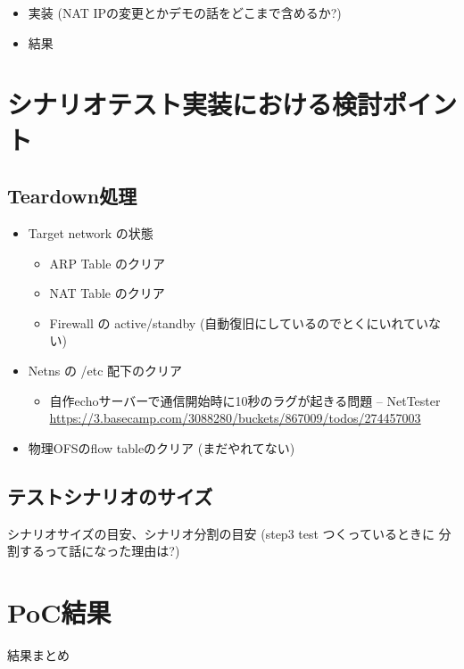 \begin{itemize}
 \item 実装 (NAT IPの変更とかデモの話をどこまで含めるか?)
 \item 結果
\end{itemize}

\section{シナリオテスト実装における検討ポイント}

\subsection{Teardown処理}

\begin{itemize}
 \item Target network の状態
       \begin{itemize}
        \item ARP Table のクリア
        \item NAT Table のクリア
        \item Firewall の active/standby (自動復旧にしているのでとくにいれていない)
       \end{itemize}
 \item Netns の /etc 配下のクリア
       \begin{itemize}
        \item 自作echoサーバーで通信開始時に10秒のラグが起きる問題 – NetTester \url{https://3.basecamp.com/3088280/buckets/867009/todos/274457003}
       \end{itemize}
 \item 物理OFSのflow tableのクリア (まだやれてない)
\end{itemize}

\subsection{テストシナリオのサイズ}

シナリオサイズの目安、シナリオ分割の目安 (step3 test つくっているときに
分割するって話になった理由は?)

\section{PoC結果}

結果まとめ


